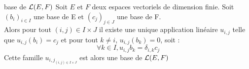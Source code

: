 

\begin{proposition}{22.30}{base de $\mathcal{L}(E,F)$}
    Soit $E$ et $F$ deux espaces vectoriels de dimension finie. Soit $(b_i)_{i \in I}$ une base de E et $(c_j)_{j \in J}$ une base de F. \\Alors pour tout $(i,j) \in I \times J$ il existe une unique application linéaire $u_{i,j}$ telle que $u_{i,j}(b_i) = c_j$ et pour tout $k\neq i$, $u_{i,j}(b_k) = 0$, soit : $$\forall k \in I, u_{i,j}{b_k} = \delta_{i,k}c_j$$
    Cette famille $u_{i,j}_{(i,j) \in I \times J}$ est alors une base de $\mathcal{L}(E,F)$
\end{proposition}

